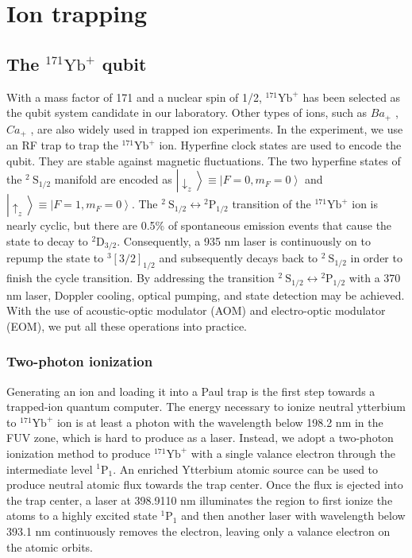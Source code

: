 
\chapter{Ion trapping}

\section{The \texorpdfstring{${ }^{171} \mathrm{Yb}^{+}$}{} qubit}

With a mass factor of 171 and a nuclear spin of 1/2, ${ }^{171} \mathrm{Yb}^{+}$ has been selected as the qubit system candidate in our laboratory. Other types of ions, such as $Ba_+$ \cite{RN259,RN156,RN253}, $Ca_+$ \cite{RN164}, are also widely used in trapped ion experiments. In the experiment, we use an RF trap to trap the ${ }^{171} \mathrm{Yb}^{+}$ ion. Hyperfine clock states are used to encode the qubit. They are stable against magnetic fluctuations. The two hyperfine states of the ${ }^2 \mathrm{~S}_{1 / 2}$ manifold are encoded as $\left|\downarrow_z\right\rangle \equiv\left|F=0, m_F=0\right\rangle$ and $\left|\uparrow_z\right\rangle \equiv\left|F=1, m_F=0\right\rangle$. The ${ }^2 \mathrm{~S}_{1 / 2} \leftrightarrow{ }^2 \mathrm{P}_{1 / 2}$ transition of the ${ }^{171} \mathrm{Yb}^{+}$ ion is nearly cyclic, but there are 0.5\% of spontaneous emission events that cause the state to decay to ${ }^2 \mathrm{D}_{3 / 2}$. Consequently, a 935 nm laser is continuously on to repump the state to ${ }^{3} [3 / 2]_{1 / 2}$ and subsequently decays back to ${ }^2 \mathrm{~S}_{1 / 2}$ in order to finish the cycle transition. By addressing the transition ${ }^2 \mathrm{~S}_{1 / 2} \leftrightarrow{ }^2 \mathrm{P}_{1 / 2}$ with a 370 nm laser, Doppler cooling, optical pumping, and state detection may be achieved. With the use of acoustic-optic modulator (AOM) and electro-optic modulator (EOM), we put all these operations into practice.

\subsection{Two-photon ionization}

Generating an ion and loading it into a Paul trap is the first step towards a trapped-ion quantum computer. The energy necessary to ionize neutral ytterbium to ${ }^{171} \mathrm{Yb}^{+}$ ion is at least a photon with the wavelength below 198.2 nm in the FUV zone, which is hard to produce as a laser. Instead, we adopt a two-photon ionization method to produce ${ }^{171} \mathrm{Yb}^{+}$ with a single valance electron through the intermediate level ${ }^1 \mathrm{P}_1$. An enriched Ytterbium atomic source can be used to produce neutral atomic flux towards the trap center. Once the flux is ejected into the trap center, a laser at 398.9110 nm illuminates the region to first ionize the atoms to a highly excited state ${ }^1 \mathrm{P}_1$ and then another laser with wavelength below 393.1 nm continuously removes the electron, leaving only a valance electron on the atomic orbits.

